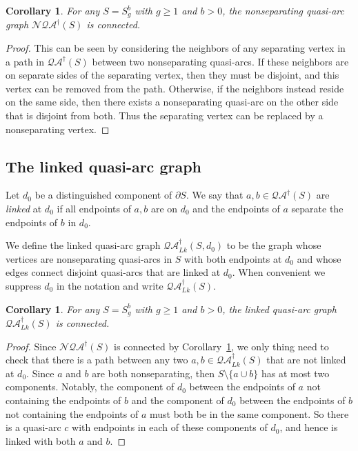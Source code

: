 \documentclass[12pt,a4paper]{amsart}
\theoremstyle{definition}
\theoremstyle{plain}
\newtheorem{corollary}[theorem]{Corollary}
\numberwithin{equation}{section}
\newcommand{\qag}{\mathcal{QA}^{\dagger}}
\newcommand{\nqag}{\mathcal{N\!QA}^{\dagger}}
\newcommand{\lqag}{\mathcal{QA}_{Lk}^{\dagger}}
\begin{document}
\begin{corollary}\label{Cor:NonSeparatingQuasiArcGraphConnected}
    For any $S = S_g^b$ with $g\geq1$ and $b>0$, the nonseparating quasi-arc graph $\nqag(S)$ is connected.
\end{corollary}

\begin{proof} 
    This can be seen by considering the neighbors of any separating vertex in a path in $\qag(S)$ between two nonseparating quasi-arcs. If these neighbors are on separate sides of the separating vertex, then they must be disjoint, and this vertex can be removed from the path. Otherwise, if the neighbors instead reside on the same side, then there exists a nonseparating quasi-arc on the other side that is disjoint from both. Thus the separating vertex can be replaced by a nonseparating vertex.
\end{proof}

\subsection*{The linked quasi-arc graph}
 Let $d_0$ be a distinguished component of $\partial S$.  We say that $a, b \in \qag(S)$ are \textit{linked} at $d_0$ if all endpoints of $a, b$ are on $d_0$ and the endpoints of $a$ separate the endpoints of $b$ in $d_0$.

We define the linked quasi-arc graph $\lqag(S,d_0)$ to be the graph whose vertices are nonseparating quasi-arcs in $S$ with both endpoints at $d_0$ and whose edges connect disjoint quasi-arcs that are linked at $d_0$. When convenient we suppress $d_0$ in the notation and write $\lqag(S)$.

\begin{corollary}\label{Cor:LinkedQuasiArcGraphConnected}
    For any $S = S_g^b$ with $g\geq1$ and $b>0$, the linked quasi-arc graph $\lqag(S)$ is connected.
\end{corollary}

\begin{proof}
    Since $\nqag(S)$ is connected by Corollary~\ref{Cor:NonSeparatingQuasiArcGraphConnected}, we only thing need to  check that there is a path between any two $a, b \in \lqag(S)$ that are not linked at $d_0$. Since $a$ and $b$ are both nonseparating, then $S\setminus \{a \cup b\}$ has at most two components. Notably, the component of $d_0$ between the endpoints of $a$ not containing the endpoints of $b$ and the component of $d_0$ between the endpoints of $b$ not containing the endpoints of $a$ must both be in the same component. So there is a quasi-arc $c$ with endpoints in each of these components of $d_0$, and hence is linked with both $a$ and $b$.
\end{proof}
\end{document}
